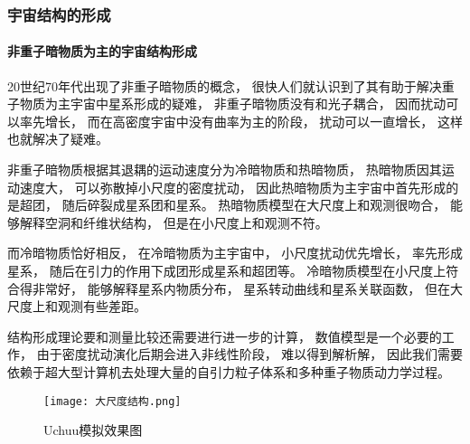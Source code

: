\documentclass[8pt]{beamer}
\begin{document}
        \begin{frame}[fragile]
            \frametitle{宇宙结构的形成}
            \framesubtitle{非重子暗物质为主的宇宙结构形成}
            \begin{multicols}{2} 
                \qquad
                20世纪70年代出现了非重子暗物质的概念，
                很快人们就认识到了其有助于解决重子物质为主宇宙中星系形成的疑难，
                非重子暗物质没有和光子耦合，
                因而扰动可以率先增长，
                而在高密度宇宙中没有曲率为主的阶段，
                扰动可以一直增长，
                这样也就解决了疑难。

                \qquad
                非重子暗物质根据其退耦的运动速度分为冷暗物质和热暗物质，
                热暗物质因其运动速度大，
                可以弥散掉小尺度的密度扰动，
                因此热暗物质为主宇宙中首先形成的是超团，
                随后碎裂成星系团和星系。
                热暗物质模型在大尺度上和观测很吻合，
                能够解释空洞和纤维状结构，
                但是在小尺度上和观测不符。

                \qquad
                而冷暗物质恰好相反，
                在冷暗物质为主宇宙中，
                小尺度扰动优先增长，
                率先形成星系，
                随后在引力的作用下成团形成星系和超团等。
                冷暗物质模型在小尺度上符合得非常好，
                能够解释星系内物质分布，
                星系转动曲线和星系关联函数，
                但在大尺度上和观测有些差距。

                \qquad
                结构形成理论要和测量比较还需要进行进一步的计算，
                数值模型是一个必要的工作，
                由于密度扰动演化后期会进入非线性阶段，
                难以得到解析解，
                因此我们需要依赖于超大型计算机去处理大量的自引力粒子体系和多种重子物质动力学过程。
                \begin{figure}[h]
                    \centering
                    \texttt{[image: 大尺度结构.png]}  
                    \caption{Uchuu模拟效果图}
                \end{figure}
            \end{multicols}
        \end{frame}
\end{document}
